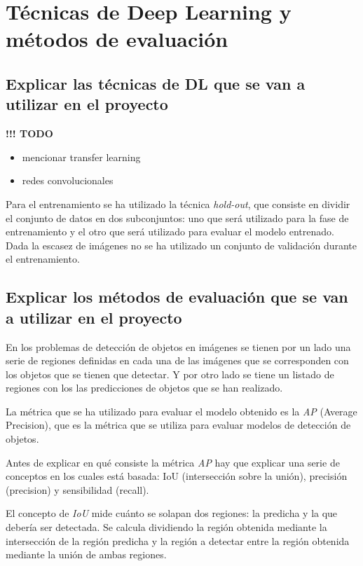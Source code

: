 \section{Técnicas de Deep Learning y métodos de evaluación}

\subsection{Explicar las técnicas de DL que se van a utilizar en el proyecto}


{\color{red} \textbf{!!! TODO}}

\begin{itemize}
	\item mencionar transfer learning
	\item redes convolucionales
\end{itemize}

Para el entrenamiento se ha utilizado la técnica \textit{hold-out}, que consiste en dividir el conjunto de datos en dos subconjuntos: uno que será utilizado para la fase de entrenamiento y el otro que será utilizado para evaluar el modelo entrenado. Dada la escasez de imágenes no se ha utilizado un conjunto de validación durante el entrenamiento.

\subsection{Explicar los métodos de evaluación que se van a utilizar en el proyecto}

{\color{red} En los problemas de detección de objetos en imágenes se tienen por un lado una serie de regiones definidas en cada una de las imágenes que se corresponden con los objetos que se tienen que detectar. Y por otro lado se tiene un listado de regiones con los las predicciones de objetos que se han realizado.}

La métrica que se ha utilizado para evaluar el modelo obtenido es la \textit{AP} (Average Precision), que es la métrica que se utiliza para evaluar modelos de detección de objetos.

Antes de explicar en qué consiste la métrica \textit{AP} hay que explicar una serie de conceptos en los cuales está basada: IoU (intersección sobre la unión), precisión (precision) y sensibilidad (recall).

El concepto de \textit{IoU} mide cuánto se solapan dos regiones: la predicha y la que debería ser detectada. Se calcula dividiendo la región obtenida mediante la intersección de la región predicha y la región a detectar entre la región obtenida mediante la unión de ambas regiones.

